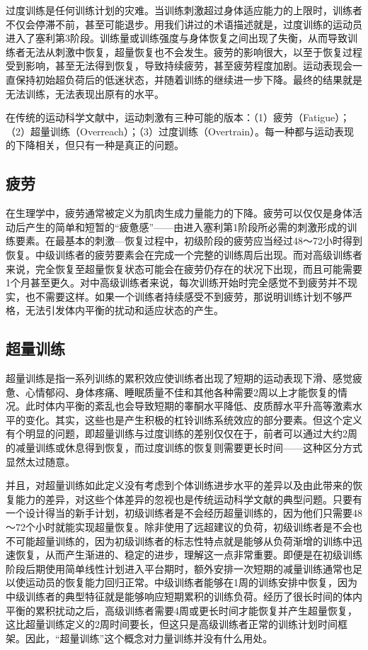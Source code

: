 过度训练是任何训练计划的灾难。当训练刺激超过身体适应能力的上限时，训练者不仅会停滞不前，甚至可能退步。用我们讲过的术语描述就是，过度训练的运动员进入了塞利第3阶段。训练量或训练强度与身体恢复之间出现了失衡，从而导致训练者无法从刺激中恢复，超量恢复也不会发生。疲劳的影响很大，以至于恢复过程受到影响，甚至无法得到恢复，导致持续疲劳，甚至疲劳程度加剧。运动表现会一直保持初始超负荷后的低迷状态，并随着训练的继续进一步下降。最终的结果就是无法训练，无法表现出原有的水平。

在传统的运动科学文献中，运动刺激有三种可能的版本：（1）疲劳（Fatigue）；（2）超量训练（Overreach）；（3）过度训练（Overtrain）。每一种都与运动表现的下降相关，但只有一种是真正的问题。

\subsection{疲劳}

在生理学中，疲劳通常被定义为肌肉生成力量能力的下降。疲劳可以仅仅是身体活动后产生的简单和短暂的“疲惫感”——由进入塞利第1阶段所必需的刺激形成的训练要素。在最基本的刺激—恢复过程中，初级阶段的疲劳应当经过48～72小时得到恢复。中级训练者的疲劳要素会在完成一个完整的训练周后出现。而对高级训练者来说，完全恢复至超量恢复状态可能会在疲劳仍存在的状况下出现，而且可能需要1个月甚至更久。对中高级训练者来说，每次训练开始时完全感觉不到疲劳并不现实，也不需要这样。如果一个训练者持续感受不到疲劳，那说明训练计划不够严格，无法引发体内平衡的扰动和适应状态的产生。

\subsection{超量训练}

超量训练是指一系列训练的累积效应使训练者出现了短期的运动表现下滑、感觉疲惫、心情郁闷、身体疼痛、睡眠质量不佳和其他各种需要2周以上才能恢复的情况。此时体内平衡的紊乱也会导致短期的睾酮水平降低、皮质醇水平升高等激素水平的变化。其实，这些也是产生积极的杠铃训练系统效应的部分要素。但这个定义有个明显的问题，即超量训练与过度训练的差别仅仅在于，前者可以通过大约2周的减量训练或休息得到恢复，而过度训练的恢复则需要更长时间——这种区分方式显然太过随意。

并且，对超量训练如此定义没有考虑到个体训练进步水平的差异以及由此带来的恢复能力的差异，对这些个体差异的忽视也是传统运动科学文献的典型问题。只要有一个设计得当的新手计划，初级训练者是不会经历超量训练的，因为他们只需要48～72个小时就能实现超量恢复。除非使用了远超建议的负荷，初级训练者是不会也不可能超量训练的，因为初级训练者的标志性特点就是能够从负荷渐增的训练中迅速恢复，从而产生渐进的、稳定的进步，理解这一点非常重要。即便是在初级训练阶段后期使用简单线性计划进入平台期时，额外安排一次短期的减量训练通常也足以使运动员的恢复能力回归正常。中级训练者能够在1周的训练安排中恢复，因为中级训练者的典型特征就是能够响应短期累积的训练负荷。经历了很长时间的体内平衡的累积扰动之后，高级训练者需要4周或更长时间才能恢复并产生超量恢复，这比超量训练定义的2周时间要长，但这只是高级训练者正常的训练计划时间框架。因此，“超量训练”这个概念对力量训练并没有什么用处。

